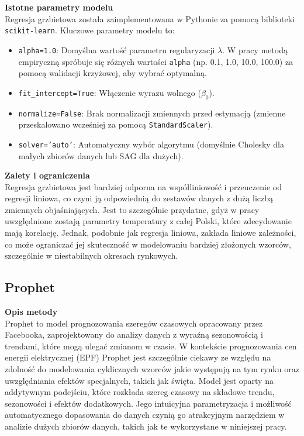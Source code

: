 \textbf{Istotne parametry modelu} \\
Regresja grzbietowa została zaimplementowana w Pythonie za pomocą biblioteki \texttt{scikit-learn}. Kluczowe parametry modelu to:
\begin{itemize}
    \item \texttt{alpha=1.0}: Domyślna wartość parametru regularyzacji \( \lambda \). W pracy metodą empiryczną spróbuje się różnych wartości \texttt{alpha} (np. 0.1, 1.0, 10.0, 100.0) za pomocą walidacji krzyżowej, aby wybrać optymalną.
    \item \texttt{fit\_intercept=True}: Włączenie wyrazu wolnego (\( \beta_0 \)).
    \item \texttt{normalize=False}: Brak normalizacji zmiennych przed estymacją (zmienne przeskalowano wcześniej za pomocą \texttt{StandardScaler}).
    \item \texttt{solver='auto'}: Automatyczny wybór algorytmu (domyślnie Cholesky dla małych zbiorów danych lub SAG dla dużych).
\end{itemize}

\textbf{Zalety i ograniczenia} \\
Regresja grzbietowa jest bardziej odporna na współliniowość i przeuczenie od regresji liniowa, co czyni ją odpowiednią do zestawów danych z dużą liczbą zmiennych objaśniających. Jest to szczególnie przydatne, gdyż w pracy uwzględnione zostają parametry temperatury z całej Polski, które zdecydowanie mają korelację. Jednak, podobnie jak regresja liniowa, zakłada liniowe zależności, co może ograniczać jej skuteczność w modelowaniu bardziej złożonych wzorców, szczególnie w niestabilnych okresach rynkowych.

\subsection{Prophet}

\textbf{Opis metody} \\
Prophet \cite{prophet_doc} to model prognozowania szeregów czasowych opracowany przez Facebooka, zaprojektowany do analizy danych z wyraźną sezonowością i trendami, które mogą ulegać zmianom w czasie. W kontekście prognozowania cen energii elektrycznej (EPF) Prophet jest szczególnie ciekawy ze względu na zdolność do modelowania cyklicznych wzorców jakie występują na tym rynku oraz uwzględniania efektów specjalnych, takich jak święta. Model jest oparty na addytywnym podejściu, które rozkłada szereg czasowy na składowe trendu, sezonowości i efektów dodatkowych. Jego intuicyjna parametryzacja i możliwość automatycznego dopasowania do danych czynią go atrakcyjnym narzędziem w analizie dużych zbiorów danych, takich jak te wykorzystane w niniejszej pracy.


